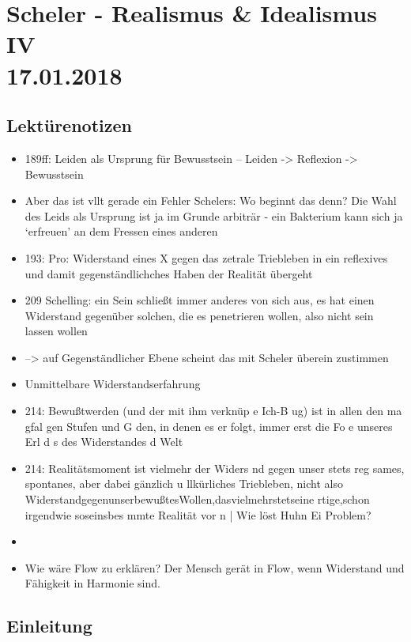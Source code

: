\documentclass[emulatestandardclasses]{scrartcl}
\begin{document}
\section{Scheler - Realismus \& Idealismus IV\\17.01.2018}

\subsection{Lektürenotizen}

\begin{itemize}
  \item 189ff: Leiden als Ursprung für Bewusstsein -- Leiden -> Reflexion -> Bewusstsein
  \item Aber das ist vllt gerade ein Fehler Schelers: Wo beginnt das denn? Die Wahl des Leids als Ursprung ist ja im Grunde arbiträr - ein Bakterium kann sich ja `erfreuen' an dem Fressen eines anderen
  \item 193: Pro: Widerstand eines X gegen das zetrale Triebleben  in ein reflexives und damit gegenständlichches Haben der Realität übergeht
  \item 209 Schelling: ein Sein schließt immer anderes von sich aus, es hat einen Widerstand gegenüber solchen, die es penetrieren wollen, also nicht sein lassen wollen
  \item --> auf Gegenständlicher Ebene scheint das mit Scheler überein zustimmen
  \item Unmittelbare Widerstandserfahrung
  \item 214: Bewußtwerden (und der mit ihm verknüp e Ich-B ug) ist in allen den ma gfal gen Stufen und G den, in denen es er­ folgt, immer erst die Fo e unseres Erl d s des Widerstandes d  Welt
  \item 214: Realitätsmoment ist vielmehr der Widers nd gegen unser stets reg­ sames, spontanes, aber dabei gänzlich u llkürliches Triebleben, nicht also WiderstandgegenunserbewußtesWollen,dasvielmehrstetseine rtige,schon irgendwie soseinsbes mmte Realität vor n | Wie löst Huhn Ei Problem?
  \item 
\end{itemize}


\begin{itemize}
  \item Wie wäre Flow zu erklären? Der Mensch gerät in Flow, wenn Widerstand und Fähigkeit in Harmonie sind.  
\end{itemize}

\subsection{Einleitung}
\end{document}
